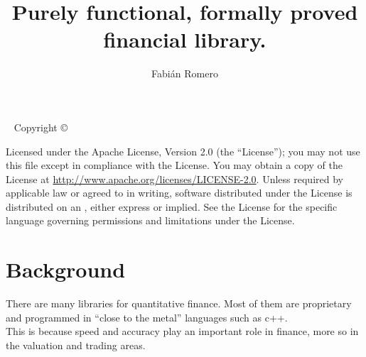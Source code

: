 \documentclass{tufte-book} %
\title{Purely functional, formally proved financial library.} %
\author{Fabián Romero} %
\begin{document}
\maketitle %

\newpage
\begin{fullwidth}
~\vfill
\thispagestyle{empty}
\setlength{\parindent}{0pt}
\setlength{\parskip}{\baselineskip}
Copyright \copyright\ \the\year\ \thanklessauthor

\par{}

\par{}

\par Licensed under the Apache License, Version 2.0 (the ``License''); you may not use this file except in compliance with the License. You may obtain a copy of the License at \url{http://www.apache.org/licenses/LICENSE-2.0}. Unless required by applicable law or agreed to in writing, software distributed under the License is distributed on an , either express or implied. See the License for the specific language governing permissions and limitations under the License.

\end{fullwidth}

\tableofcontents %


\chapter{Background} %

There are many libraries for quantitative finance. Most of them are proprietary and programmed in ``close to the metal'' languages such as c++. \\
This is because speed and accuracy play an important role in finance, more so in the valuation and trading areas.\\
\end{document}
